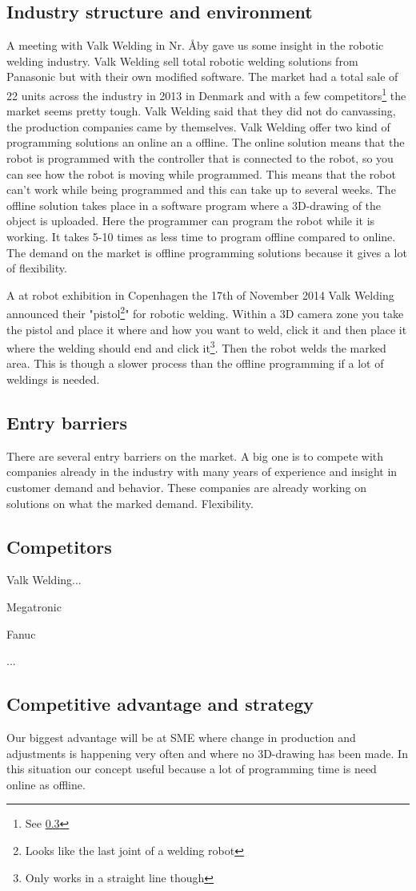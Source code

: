 \subsection{Industry structure and environment}
A meeting with Valk Welding in Nr. Åby gave us some insight in the robotic welding industry. Valk Welding sell total robotic welding solutions from Panasonic but with their own modified software. The market had  a total sale of 22 units across the industry in 2013 in Denmark and with a few competitors\footnote{See \ref{competitors}} the market seems pretty tough. Valk Welding said that they did not do canvassing, the production companies came by themselves. Valk Welding offer two kind of programming solutions an online an a offline. The online solution means that the robot is programmed with the controller that is connected to the robot, so you can see how the robot is moving while programmed. This means that the robot can't work while being programmed and this can take up to several weeks. The offline solution takes place in a software program where a 3D-drawing of the object is uploaded. Here the programmer can program the robot while it is working. It takes 5-10 times as less time to program offline compared to online. The demand on the market is offline programming solutions because it gives a lot of flexibility.

A at robot exhibition in Copenhagen the 17th of November 2014 Valk Welding announced their "pistol\footnote{Looks like the last joint of a welding robot}" for robotic welding. Within a 3D camera zone you take the pistol and place it where and how you want to weld, click it and then place it where the welding should end and click it\footnote{Only works in a straight line though}. Then the robot welds the marked area. This is though a slower process than the offline programming if a lot of weldings is needed.
\subsection{Entry barriers}
There are several entry barriers on the market. A big one is to compete with companies already in the industry with many years of experience and insight in customer demand and behavior. These companies are already working on solutions on what the marked demand. Flexibility.
\subsection{Competitors}
\label{competitors}
Valk Welding...

Megatronic

Fanuc

...
\subsection{Competitive advantage and strategy}
Our biggest advantage will be at SME where change in production and adjustments is happening very often and where no 3D-drawing has been made. In this situation our concept useful because a lot of programming time is need online as offline.

